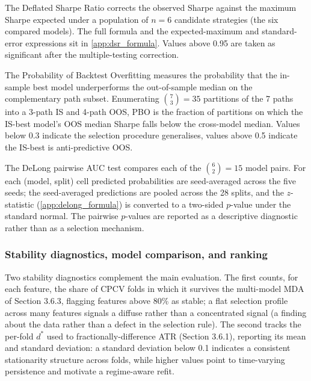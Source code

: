 The Deflated Sharpe Ratio \citep[Chapter 11]{lopez_de_prado_2018} corrects the observed Sharpe against the maximum Sharpe expected under a population of $n = 6$ candidate strategies (the six compared models). The full formula and the expected-maximum and standard-error expressions sit in \label{ref:dsr_formula_call}\autoref{app:dsr_formula}. Values above 0.95 are taken as significant after the multiple-testing correction.

The Probability of Backtest Overfitting \citep[Chapter 14]{lopez_de_prado_2018} measures the probability that the in-sample best model underperforms the out-of-sample median on the complementary path subset. Enumerating $\binom{7}{3} = 35$ partitions of the 7 paths into a 3-path IS and 4-path OOS, PBO is the fraction of partitions on which the IS-best model's OOS median Sharpe falls below the cross-model median. Values below 0.3 indicate the selection procedure generalises, values above 0.5 indicate the IS-best is anti-predictive OOS.

The DeLong pairwise AUC test \citep{delong_1988} compares each of the $\binom{6}{2} = 15$ model pairs. For each (model, split) cell predicted probabilities are seed-averaged across the five seeds; the seed-averaged predictions are pooled across the 28 splits, and the $z$-statistic (\label{ref:delong_formula_call}\autoref{app:delong_formula}) is converted to a two-sided $p$-value under the standard normal. The pairwise $p$-values are reported as a descriptive diagnostic rather than as a selection mechanism.


\subsubsection{Stability diagnostics, model comparison, and ranking}\label{subsubsec:stability_ranking}

Two stability diagnostics complement the main evaluation. The first counts, for each feature, the share of CPCV folds in which it survives the multi-model MDA of Section 3.6.3, flagging features above 80\% as stable; a flat selection profile across many features signals a diffuse rather than a concentrated signal (a finding about the data rather than a defect in the selection rule). The second tracks the per-fold $d^{\ast}$ used to fractionally-difference ATR (Section 3.6.1), reporting its mean and standard deviation: a standard deviation below 0.1 indicates a consistent stationarity structure across folds, while higher values point to time-varying persistence and motivate a regime-aware refit.

